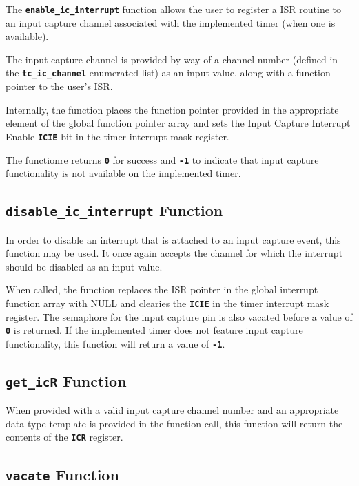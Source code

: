 \documentclass[a4paper, oneside, 11pt, titlepage, onecolumn, openright]{report}
\begin{document}
			The \textbf{\texttt{enable\_ic\_interrupt}} function allows the user to register a ISR routine to an input capture channel associated with the implemented timer (when one is available).
			
			The input capture channel is provided by way of a channel number (defined in the \textbf{\texttt{tc\_ic\_channel}} enumerated list) as an input value, along with a function pointer to the user's ISR.
			
			Internally, the function places the function pointer provided in the appropriate element of the global function pointer array and sets the Input Capture Interrupt Enable \textbf{\texttt{ICIE}} bit in the timer interrupt mask register.
			
			The functionre returns \textbf{\texttt{0}} for success and \textbf{\texttt{-1}} to indicate that input capture functionality is not available on the implemented timer.	
			
\subsection{\textbf{\texttt{disable\_ic\_interrupt}} Function}
			\label{ss:HALtcdisable_ic_interruptFunction}
			
			In order to disable an interrupt that is attached to an input capture event, this function may be used. It once again accepts the channel for which the interrupt should be disabled as an input value.
			
			When called, the function replaces the ISR pointer in the global interrupt function array with NULL and clearies the \textbf{\texttt{ICIE}} in the timer interrupt mask register. The semaphore for the input capture pin is also vacated before a value of \textbf{\texttt{0}} is returned. If the implemented timer does not feature input capture functionality, this function will return a value of \textbf{\texttt{-1}}.
			
\subsection{\textbf{\texttt{get\_icR}} Function}
			\label{ss:HALtcget_icR_interruptFunction}
			
			When provided with a valid input capture channel number and an appropriate data type template is provided in the function call, this function will return the contents of the \textbf{\texttt{ICR}} register.	
			
\subsection{\textbf{\texttt{vacate}} Function}
			\label{ss:HALtcvacateFunction}
			
\end{document}
